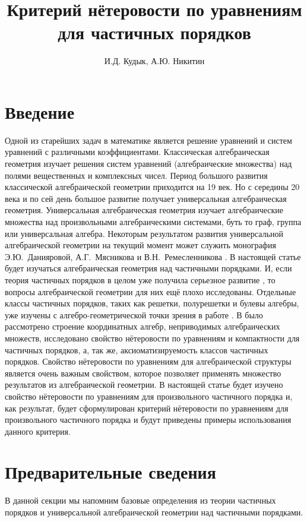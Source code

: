 \documentclass[12pt]{article}
\title{Критерий нётеровости по уравнениям для частичных порядков}
\author{И.Д. Кудык, А.Ю. Никитин}
\theoremstyle{break}
\begin{document}
    \maketitle %
    \thispagestyle{empty} %
    \tableofcontents %
    \newpage
    
    \section{Введение}
    Одной из старейших задач в математике является решение уравнений и систем уравнений с различными коэффициентами. Классическая алгебраическая геометрия изучает решения систем уравнений (алгебраические множества) над полями вещественных и комплексных чисел. Период большого развития классической алгебраической геометрии приходится на 19 век. Но с середины 20 века и по сей день большое развитие получает универсальная алгебраическая геометрия. Универсальная алгебраическая геометрия изучает алгебраические множества над произвольными алгебраическими системами, буть то граф, группа или универсальная алгебра. Некоторым результатом развития универсальной алгебраической геометрии на текущий момент может служить монография Э.Ю.~Данияровой, А.Г.~Мясникова и В.Н.~Ремесленникова \cite{AlgGeom}. В настоящей статье будет изучаться алгебраическая геометрия над частичными порядками. И, если теория частичных порядков в целом уже получила серьезное развитие \cite{Gretzer}, то вопросы алгебраической геометрии для них ещё плохо исследованы. Отдельные классы частичных порядков, таких как решетки, полурешетки и булевы алгебры, уже изучены с алгебро-геометрической точки зрения в работе \cite{Semilattice}. В \cite{Semilattice} было рассмотрено строение координатных алгебр, неприводимых алгебраических множеств, исследовано свойство нётеровости по уравнениям и компактности для частичных порядков, а, так же, аксиоматизируемость классов частичных порядков. Свойство нётеровости по уравнениям для алгебраической структуры является очень важным свойством, которое позволяет применять множество результатов из алгебраической геометрии. В настоящей статье будет изучено свойство нётеровости по уравнениям для произвольного частичного порядка и, как результат, будет сформулирован критерий нётеровости по уравнениям для произвольного частичного порядка и будут приведены примеры использования данного критерия.

	\section{Предварительные сведения}
		В данной секции мы напомним базовые определения из теории частичных порядков и универсальной алгебраической геометрии над частичными порядками.
			
\end{document}
